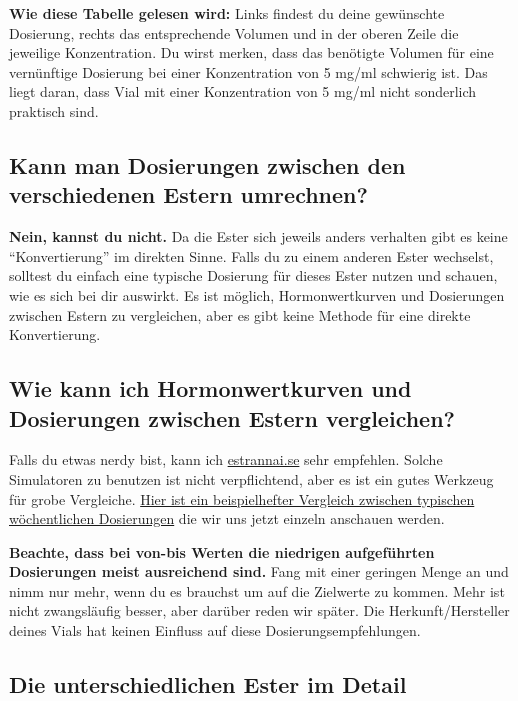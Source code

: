 \documentclass{article}
\begin{document}
\textbf{Wie diese Tabelle gelesen wird:} Links findest du deine gewünschte Dosierung, rechts das entsprechende Volumen und in der oberen Zeile die jeweilige Konzentration. Du wirst merken, dass das benötigte Volumen für eine vernünftige Dosierung bei einer Konzentration von 5 mg/ml schwierig ist. Das liegt daran, dass Vial mit einer Konzentration von 5 mg/ml nicht sonderlich praktisch sind.

\subsection{Kann man Dosierungen zwischen den verschiedenen Estern umrechnen?}

\textbf{Nein, kannst du nicht.} Da die Ester sich jeweils anders verhalten gibt es keine “Konvertierung” im direkten Sinne. Falls du zu einem anderen Ester wechselst, solltest du einfach eine typische Dosierung für dieses Ester nutzen und schauen, wie es sich bei dir auswirkt. Es ist möglich, Hormonwertkurven und Dosierungen zwischen Estern zu vergleichen, aber es gibt keine Methode für eine direkte Konvertierung.

\subsection{Wie kann ich Hormonwertkurven und Dosierungen zwischen Estern vergleichen?}

Falls du etwas nerdy bist, kann ich \href{https://estrannai.se}{estrannai.se} sehr empfehlen. Solche Simulatoren zu benutzen ist nicht verpflichtend, aber es ist ein gutes Werkzeug für grobe Vergleiche. \href{https://estrannai.se/\#i0__cu,7,7,1-cu,5,7,3-cu,5,7,2}{Hier ist ein beispielhefter Vergleich zwischen typischen wöchentlichen Dosierungen} die wir uns jetzt einzeln anschauen werden.

\textbf{Beachte, dass bei von-bis Werten die niedrigen aufgeführten Dosierungen meist ausreichend sind.} Fang mit einer geringen Menge an und nimm nur mehr, wenn du es brauchst um auf die Zielwerte zu kommen. Mehr ist nicht zwangsläufig besser, aber darüber reden wir später. Die Herkunft/Hersteller deines Vials hat keinen Einfluss auf diese Dosierungsempfehlungen.

\subsection*{Die unterschiedlichen Ester im Detail}
\end{document}
